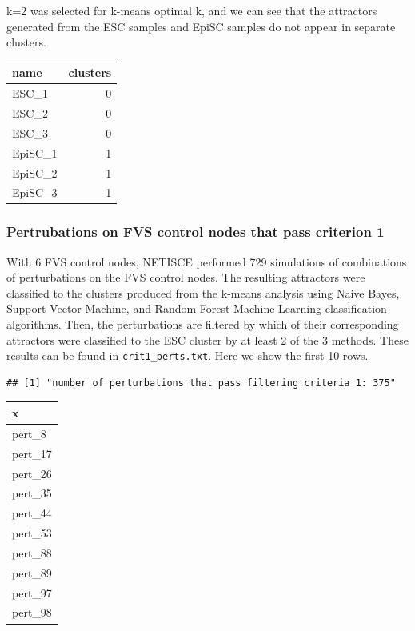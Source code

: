 \documentclass[
]{book}
\begin{document}
k=2 was selected for k-means optimal k, and we can see that the attractors generated from the ESC samples and EpiSC samples do not appear in separate clusters.

\begin{tabular}{l|r}
\hline
name & clusters\\
\hline
ESC\_1 & 0\\
\hline
ESC\_2 & 0\\
\hline
ESC\_3 & 0\\
\hline
EpiSC\_1 & 1\\
\hline
EpiSC\_2 & 1\\
\hline
EpiSC\_3 & 1\\
\hline
\end{tabular}

\hypertarget{section-id}{%
\subsubsection*{Pertrubations on FVS control nodes that pass criterion 1}\label{section-id}}

With 6 FVS control nodes, NETISCE performed 729 simulations of combinations of perturbations on the FVS control nodes. The resulting attractors were classified to the clusters produced from the k-means analysis using Naive Bayes, Support Vector Machine, and Random Forest Machine Learning classification algorithms. Then, the perturbations are filtered by which of their corresponding attractors were classified to the ESC cluster by at least 2 of the 3 methods. These results can be found in \href{https://github.com/VeraLiconaResearchGroup/Netisce/blob/main/ipsc_validation/results/crit1perts.txt}{\texttt{crit1\_perts.txt}}. Here we show the first 10 rows.

\begin{verbatim}
## [1] "number of perturbations that pass filtering criteria 1: 375"
\end{verbatim}

\begin{tabular}{l}
\hline
x\\
\hline
pert\_8\\
\hline
pert\_17\\
\hline
pert\_26\\
\hline
pert\_35\\
\hline
pert\_44\\
\hline
pert\_53\\
\hline
pert\_88\\
\hline
pert\_89\\
\hline
pert\_97\\
\hline
pert\_98\\
\hline
\end{tabular}
\end{document}
